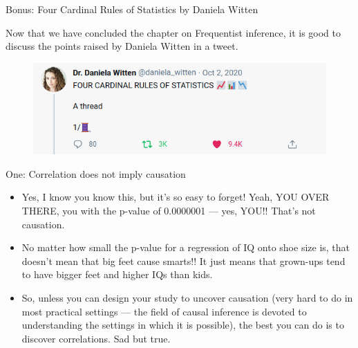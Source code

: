 \documentclass[handout]{beamer}
\begin{document}
\begin{frame}{Bonus: Four Cardinal Rules of Statistics by Daniela Witten}
\scriptsize{

Now that we have concluded the chapter on Frequentist inference, it is good to discuss the points raised by Daniela Witten in a tweet.

\begin{figure}[h!]
	\centering
	\includegraphics[scale=0.3]{pics/witten.png}
\end{figure}


\begin{block}{One: Correlation does not imply causation}
\begin{itemize}
 \item Yes, I know you know this, but it’s so easy to forget! Yeah, YOU OVER THERE, you with the p-value of 0.0000001 — yes, YOU!! That’s not causation.
 \item No matter how small the p-value for a regression of IQ onto shoe size is, that doesn’t mean that big feet cause smarts!!  It just means that grown-ups tend to have bigger feet and higher IQs than kids.
 \item So, unless you can design your study to uncover causation (very hard to do in most practical settings — the field of causal inference is devoted to understanding the settings in which it is possible), the best you can do is to discover correlations.  Sad but true.
\end{itemize}

 
\end{block}




} 
\end{frame}
\end{document}
